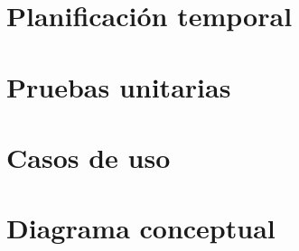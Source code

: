\section{Planificación temporal}



\section{Pruebas unitarias}



\section{Casos de uso}



\section{Diagrama conceptual}










